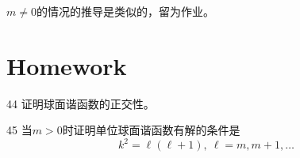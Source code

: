 \documentclass[CJK]{beamer}
\begin{document}
\begin{frame}
\bch
$m\ne 0$的情况的推导是类似的，留为作业。
\ech
\end{frame}


\section{Homework}

\begin{frame}
\bch
\bitem
\item[44]{证明球面谐函数的正交性。}
\item[45]{当$m>0$时证明单位球面谐函数有解的条件是
  $$k^2=\ell(\ell+1),\ \ell = m, m+1, \ldots$$}
  \eitem
\ech
\end{frame}
\end{document}
